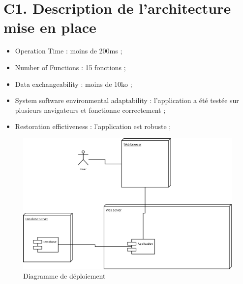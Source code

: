 \section{C1. Description de l’architecture mise en place}

	\begin{itemize}
		\item Operation Time : moins de 200ms ;
		\item Number of Functions : 15 fonctions ;
		\item Data exchangeability : moins de 10ko ;
		\item System software environmental adaptability : l'application a été testée sur plusieurs navigateurs  et fonctionne correctement ;
		\item Restoration effictiveness : l'application est robuste ;
	\end{itemize}

	\begin{figure}[h!]
		\centering
		\includegraphics[width=18cm]{./images/diagDep.png}
		\caption{Diagramme de déploiement}
	\end{figure}
